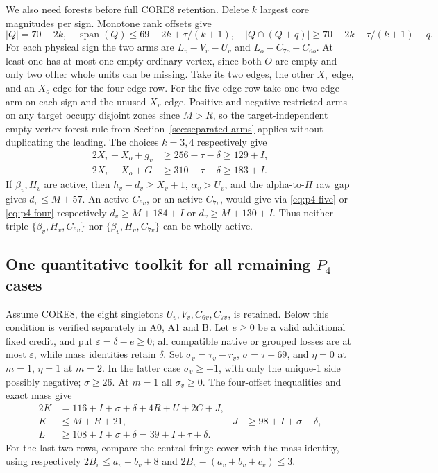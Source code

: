 \documentclass[11pt,letterpaper]{article}
\theoremstyle{definition}\newtheorem{definition}[theorem]{Definition}
\begin{document}
We also need forests before full CORE8 retention. Delete $k$ largest
core magnitudes per sign. Monotone rank offsets give
\[
 |Q|=70-2k,\quad\operatorname{span}(Q)\le69-2k+\tau/(k+1),\quad
 |Q\cap(Q+q)|\ge70-2k-\tau/(k+1)-q.
\]
For each physical sign the two arms are $L_v-V_v-U_v$ and
$L_o-C_{7o}-C_{6o}$. At least one has at most one empty ordinary vertex,
since both $O$ are empty and only two other whole units can be missing.
Take its two edges, the other $X_v$ edge, and an $X_o$ edge for the
four-edge row. For the five-edge row take one two-edge arm on each sign
and the unused $X_v$ edge. Positive and negative restricted arms on any
target occupy disjoint zones since $M>R$, so the target-independent empty-vertex forest rule from Section~\ref{sec:separated-arms}
applies without duplicating the leading. The choices $k=3,4$
respectively give
\begin{align}
 2X_v+X_o+g_v&\ge256-\tau-\delta\ge129+I,\label{eq:p4-four}\\
 2X_v+X_o+G&\ge310-\tau-\delta\ge183+I.\label{eq:p4-five}
\end{align}
If $\beta_v,H_v$ are active, then
$h_v-d_v\ge X_v+1$, $\alpha_v>U_v$, and the alpha-to-$H$ raw gap gives
$d_v\le M+57$. An active $C_{6v}$, or an active $C_{7v}$, would give via
\eqref{eq:p4-five} or \eqref{eq:p4-four} respectively
$d_v\ge M+184+I$ or $d_v\ge M+130+I$.
Thus neither triple $\{\beta_v,H_v,C_{6v}\}$ nor
$\{\beta_v,H_v,C_{7v}\}$ can be wholly active.

\subsection{One quantitative toolkit for all remaining $P_4$ cases}\label{subsec:p4-tools}
Assume CORE8, the eight singletons $U_v,V_v,C_{6v},C_{7v}$, is retained.
Below this condition is verified separately in A0, A1 and B.
Let $e\ge0$ be a valid additional fixed credit, and put
$\varepsilon=\delta-e\ge0$; all compatible native or grouped losses
are at most $\varepsilon$, while mass identities retain $\delta$.
Set $\sigma_v=\tau_v-r_v$, $\sigma=\tau-69$, and
$\eta=0$ at $m=1$, $\eta=1$ at $m=2$.
In the latter case $\sigma_v\ge-1$, with only the unique-1 side possibly
negative; $\sigma\ge26$. At $m=1$ all $\sigma_v\ge0$.
The four-offset inequalities and exact mass give
\begin{align}
 2K&=116+I+\sigma+\delta+4R+U+2C+J,\label{eq:p4-mass116}\\
 K&\le M+R+21,& J&\ge98+I+\sigma+\delta,\nonumber\\
 L&\ge108+I+\sigma+\delta=39+I+\tau+\delta.\label{eq:p4-L}
\end{align}
For the last two rows, compare the central-fringe cover with the mass
identity, using respectively $2B_v\le a_v+b_v+8$ and
$2B_v-(a_v+b_v+c_v)\le3$.
\end{document}
